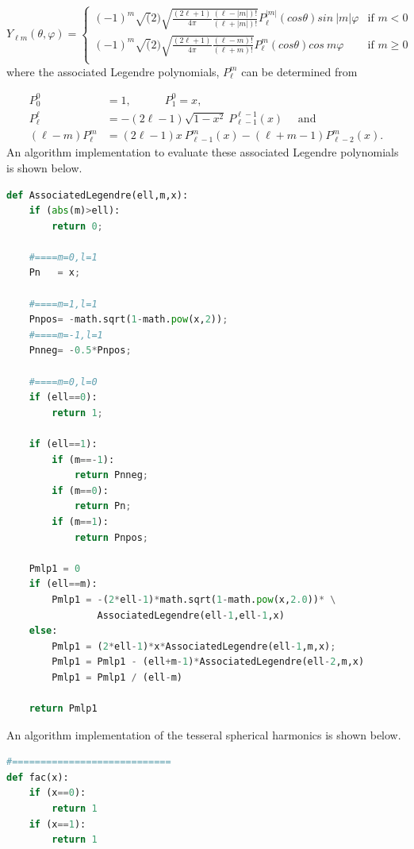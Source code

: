\documentclass[11pt,letterpaper,titlepage]{article}
\newcommand{\beqn}{\begin{equation}
	\begin{aligned}}
\newcommand{\eeqn}{\end{aligned}
	\end{equation}}
\numberwithin{equation}{section}
\begin{document}
\begin{appendices}
\begin{equation}
Y_{\ell m} (\theta, \varphi )=
\begin{cases}
(-1)^m \sqrt(2)\sqrt{ \frac{(2\ell + 1)}{4\pi}   \frac{(\ell-|m|)!}{(\ell+|m|)!}}P_{\ell}^{|m|}(cos\theta)sin\ {|m|\varphi}
& \text{if } m < 0 \\
(-1)^m \sqrt(2)\sqrt{ \frac{(2\ell + 1)}{4\pi}   \frac{(\ell-m)!}{(\ell+m)!}}P_{\ell}^{m}(cos\theta)cos\ {m\varphi}
& \text{if } m \ge 0 \\
\end{cases}
\end{equation}
\newline
where the associated Legendre polynomials, $P_\ell^m$ can be determined from

\beqn
P_0^0 &= 1, \quad \quad \quad
P_1^{0} = x, \\
P_\ell^\ell &= - (2\ell-1) \sqrt{1-x^2} \ P_{\ell-1}^{\ell-1}(x) \quad \text{ and}\\
(\ell - m)
P_\ell^m &= (2\ell-1)x \ P_{\ell-1}^m(x) - (\ell+m -1)P_{\ell-2}^m (x).
\eeqn
\newline
An algorithm implementation to evaluate these associated Legendre polynomials is shown below.

\begin{lstlisting}[language=python]
def AssociatedLegendre(ell,m,x):
    if (abs(m)>ell):
        return 0;
    
    #====m=0,l=1
    Pn   = x;
    
    #====m=1,l=1
    Pnpos= -math.sqrt(1-math.pow(x,2));
    #====m=-1,l=1
    Pnneg= -0.5*Pnpos;
    
    #====m=0,l=0
    if (ell==0):
        return 1;
    
    if (ell==1):
        if (m==-1):
            return Pnneg;
        if (m==0):
            return Pn;
        if (m==1):
            return Pnpos;

    Pmlp1 = 0
    if (ell==m):
        Pmlp1 = -(2*ell-1)*math.sqrt(1-math.pow(x,2.0))* \
                AssociatedLegendre(ell-1,ell-1,x)
    else:
        Pmlp1 = (2*ell-1)*x*AssociatedLegendre(ell-1,m,x);
        Pmlp1 = Pmlp1 - (ell+m-1)*AssociatedLegendre(ell-2,m,x)
        Pmlp1 = Pmlp1 / (ell-m)
    
    return Pmlp1 
\end{lstlisting} 

An algorithm implementation of the tesseral spherical harmonics is shown below.

\begin{lstlisting}[language=python]
#============================
def fac(x):
    if (x==0):
        return 1
    if (x==1):
        return 1
    

\end{lstlisting}
\end{appendices}
\end{document}

